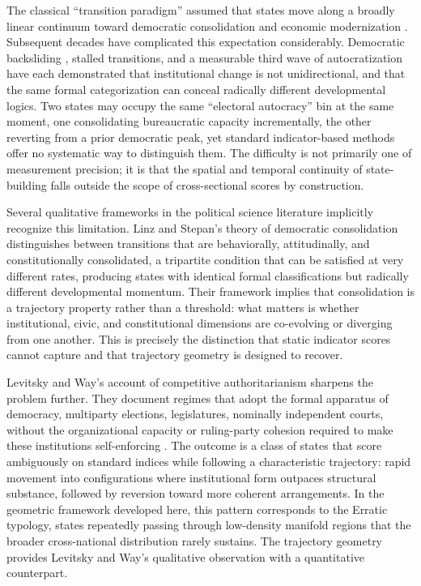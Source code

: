 \documentclass[12pt]{article}
\begin{document}
The classical ``transition paradigm'' assumed that states move along a broadly linear continuum toward democratic consolidation and economic modernization \cite{huntington1991third}. Subsequent decades have complicated this expectation considerably. Democratic backsliding \cite{bermeo2016democratic}, stalled transitions, and a measurable third wave of autocratization \cite{lhrmann2019third} have each demonstrated that institutional change is not unidirectional, and that the same formal categorization can conceal radically different developmental logics. Two states may occupy the same ``electoral autocracy'' bin at the same moment, one consolidating bureaucratic capacity incrementally, the other reverting from a prior democratic peak, yet standard indicator-based methods offer no systematic way to distinguish them. The difficulty is not primarily one of measurement precision; it is that the spatial and temporal continuity of state-building falls outside the scope of cross-sectional scores by construction.

Several qualitative frameworks in the political science literature implicitly recognize this limitation. Linz and Stepan's \cite{linzstepan1996} theory of democratic consolidation distinguishes between transitions that are behaviorally, attitudinally, and constitutionally consolidated, a tripartite condition that can be satisfied at very different rates, producing states with identical formal classifications but radically different developmental momentum. Their framework implies that consolidation is a trajectory property rather than a threshold: what matters is whether institutional, civic, and constitutional dimensions are co-evolving or diverging from one another. This is precisely the distinction that static indicator scores cannot capture and that trajectory geometry is designed to recover.

Levitsky and Way's \cite{levitskyway2010} account of competitive authoritarianism sharpens the problem further. They document regimes that adopt the formal apparatus of democracy, multiparty elections, legislatures, nominally independent courts, without the organizational capacity or ruling-party cohesion required to make these institutions self-enforcing \cite{diamond2002elections, schedler2002menu}. The outcome is a class of states that score ambiguously on standard indices while following a characteristic trajectory: rapid movement into configurations where institutional form outpaces structural substance, followed by reversion toward more coherent arrangements. In the geometric framework developed here, this pattern corresponds to the Erratic typology, states repeatedly passing through low-density manifold regions that the broader cross-national distribution rarely sustains. The trajectory geometry provides Levitsky and Way's qualitative observation with a quantitative counterpart.
\end{document}
